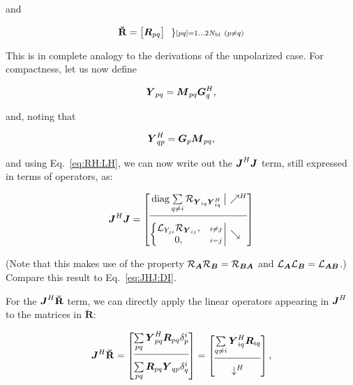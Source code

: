 \documentclass[useAMS,usenatbib]{mn2e}
\makeatletter
\newcommand{\mat}[1]{{\bmath{#1}}}
\newcommand{\JJ}{\mat{J}} %
\newcommand{\MM}{\mat{M}}
\newcommand{\RR}{\mat{R}}
\newcommand{\GG}{\mat{G}}
\newcommand{\JHJ}{\JJ^H\JJ} %
\newcommand{\Matrix}[2]{\left [ \begin{array}{@{}#1@{}}#2\end{array} \right ]}
\newcommand{\Stack}[1]{\begin{array}{@{}c@{}}#1\end{array}}
\newcommand{\AUGx}[1]{\mathbf{\breve{#1}}}
\newcommand{\RRr}{\AUGx{R}}
\newcommand{\Rop}[1]{\mathcal{R}_{{#1}}}
\newcommand{\Lop}[1]{\mathcal{L}_{{#1}}}
\makeatother
\begin{document}
and 

\begin{equation}
\RRr = \Matrix{c}{ \mat{R}_{pq}}~~ 
\} \scriptstyle [pq]=1\dots 2\Nbl~(p\ne q)\\ 
\end{equation}

This is in complete analogy to the derivations of the unpolarized case. For compactness, let us now define

\newcommand{\YY}{\mat{Y}}
\newcommand{\ZZ}{\mat{Z}}
\[
\YY_{pq} = \MM_{pq} \GG^H_q,
\]

and, noting that 

\[
\YY_{qp}^H = \GG_p \MM_{pq},
\]

and using Eq.~\ref{eq:RH:LH}, we can now write out the $\JHJ$ term, still expressed in terms of 
operators, as:

\begin{equation}
\label{eq:JHJ:pol}
\JHJ = \JHJblocks{
  \mathrm{diag}\sum\limits_{q\ne i} \Rop{\YY_{iq} \YY^H_{iq}} 
}{
  \left \{ 
  \begin{array}{@{}cc@{}}
   \Lop{ Y_{ji}  } \Rop{\YY_{ij}},&{\scriptstyle i\ne j} \\
   0, &{\scriptstyle i=j}
  \end{array} \right . 
}
\end{equation}

(Note that this makes use of the property $\Rop{\mat{A}}\Rop{\mat{B}}=\Rop{\mat{BA}}$ and 
$\Lop{\mat{A}}\Lop{\mat{B}}=\Lop{\mat{AB}}$.) Compare this result to Eq.~\ref{eq:JHJ:DI}.

For the $\JJ^H\RRr$ term, we can directly apply the linear operators appearing in $\JJ^H$ 
to the matrices in $\RRr$:

\begin{equation}
\JJ^H\RRr = \Matrix{c}{ 
\sum\limits_{pq} \YY^H_{pq} \RR_{pq} \delta^{i}_p  \\
\hline\\[-8pt]
\sum\limits_{pq} \RR_{pq} \YY_{qp} \delta^{i}_q 
} = \Matrix{c}{
\sum\limits_{q\ne i} \YY^H_{iq} \RR_{iq} \\
\hline\\[-8pt]
\downarrow^H
},
\end{equation}
\end{document}
